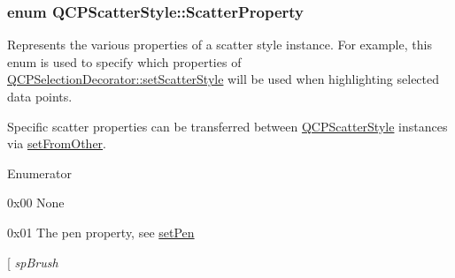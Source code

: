 \subsubsection[{\texorpdfstring{Scatter\+Property}{ScatterProperty}}]{\setlength{\rightskip}{0pt plus 5cm}enum {\bf Q\+C\+P\+Scatter\+Style\+::\+Scatter\+Property}}\hypertarget{classQCPScatterStyle_a8974f6a20f8f6eea7781f0e6af9deb46}{}\label{classQCPScatterStyle_a8974f6a20f8f6eea7781f0e6af9deb46}
Represents the various properties of a scatter style instance. For example, this enum is used to specify which properties of \hyperlink{classQCPSelectionDecorator_ab403a613289714ff4fd4a0c0371ab116}{Q\+C\+P\+Selection\+Decorator\+::set\+Scatter\+Style} will be used when highlighting selected data points.

Specific scatter properties can be transferred between \hyperlink{classQCPScatterStyle}{Q\+C\+P\+Scatter\+Style} instances via \hyperlink{classQCPScatterStyle_a7d59ba8864914f765817841089e436f1}{set\+From\+Other}. \begin{Desc}
\item[Enumerator]\par
\begin{description}
\item[{\em 
sp\+None\hypertarget{classQCPScatterStyle_a8974f6a20f8f6eea7781f0e6af9deb46a5891be10bea382fad6c20f7737a2dd90}{}\label{classQCPScatterStyle_a8974f6a20f8f6eea7781f0e6af9deb46a5891be10bea382fad6c20f7737a2dd90}
}]{\ttfamily 0x00} None \item[{\em 
sp\+Pen\hypertarget{classQCPScatterStyle_a8974f6a20f8f6eea7781f0e6af9deb46aa04d012e7c03e455db2b68fdd55c2a04}{}\label{classQCPScatterStyle_a8974f6a20f8f6eea7781f0e6af9deb46aa04d012e7c03e455db2b68fdd55c2a04}
}]{\ttfamily 0x01} The pen property, see \hyperlink{classQCPScatterStyle_a761f1f229cc0ca4703e1e2b89f6dd1ba}{set\+Pen} \item[{\em 
sp\+Brush\hypertarget{classQCPScatterStyle_a8974f6a20f8f6eea7781f0e6af9deb46af0499b1fc04de2dcc7e47ff0ef75c904}{}\label{classQCPScatterStyle_a8974f6a20f8f6eea7781f0e6af9deb46af0499b1fc04de2dcc7e47ff0ef75c904}
}
\end{description}
\end{Desc}
